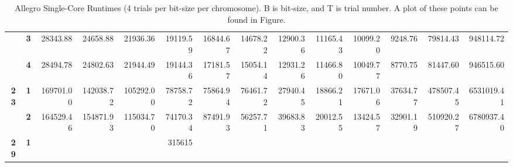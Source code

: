 \begin{table}[h!]
{\begin{tabular}{@{} ccrrrrrrrrrrrr}
\textbf{}   & \textbf{3}                     & 28343.88                         & 24658.88                         & 21936.36                         & 19119.59                         & 16844.67                         & 14678.22                         & 12900.36                         & 11165.43                         & 10099.20                         & 9248.76                          & 79814.43                        & 948114.72                          \\
\textbf{}   & \textbf{4}                     & 28494.78                         & 24802.63                         & 21944.49                         & 19144.36                         & 17181.57                         & 15054.14                         & 12931.26                         & 11466.80                         & 10049.77                         & 8770.75                          & 81447.60                        & 946515.60                          \\
\textbf{23} & \textbf{1}                     & 169701.00                        & 142038.72                        & 105292.00                        & 78758.72                         & 75864.94                         & 76461.72                         & 27940.45                         & 18866.21                         & 17671.06                         & 37634.77                         & 478507.45                       & 6531019.41                         \\
\textbf{}   & \textbf{2}                     & 164529.46                        & 154871.93                        & 115034.70                        & 74170.34                         & 87491.93                         & 56257.71                         & 39683.83                         & 20012.55                         & 13424.57                         & 32901.19                         & 510920.27                       & 6780937.40                         \\
\textbf{29} & \textbf{1}                     &                                  &                                  &                                  & 315615                           &                                  &                                  &                                  &                                  &                                  &                                  &                                 &                                   
\end{tabular}
}
\caption[Allegro Single-Core runtimes, 4 trials per chromosome, per bit-size]{Allegro Single-Core Runtimes (4 trials per bit-size per chromosome). B is bit-size, and T is trial number. A plot of these points can be found in Figure.}
\end{table}
\thispagestyle{empty}
